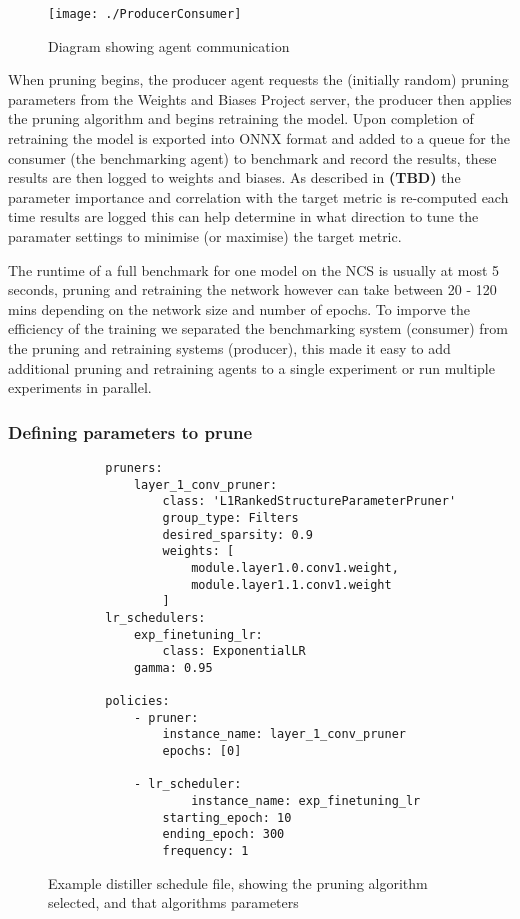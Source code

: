 \documentclass[../Dissertation.tex]{subfiles}
\begin{document}
\begin{figure}[H]
    \centering
    \texttt{[image: ./ProducerConsumer]}
    \caption{Diagram showing agent communication}
    \label{fig:agentCommunication}
\end{figure}

When pruning begins, the producer agent requests the (initially random) pruning parameters from the Weights and Biases Project server, the producer then applies the pruning algorithm and begins retraining the model.
Upon completion of retraining the model is exported into ONNX format and added to a queue for the consumer (the benchmarking agent) to benchmark and record the results, these results are then logged to weights and biases.
As described in \textbf{(TBD)} the parameter importance and correlation with the target metric is re-computed each time results are logged this can help determine in what direction to tune the paramater settings to minimise (or maximise) the target metric.

The runtime of a full benchmark for one model on the NCS is usually at most 5 seconds, pruning and retraining the network however can take between 20 - 120 mins depending on the network size and number of epochs. 
To imporve the efficiency of the training we separated the benchmarking system (consumer) from the pruning and retraining systems (producer), this made it easy to add additional pruning and retraining agents to a single experiment or run multiple experiments in parallel.

\subsubsection{Defining parameters to prune}

\singlespacing
\begin{figure}[H]
    \begin{verbatim}
        pruners: 
            layer_1_conv_pruner:
                class: 'L1RankedStructureParameterPruner'
                group_type: Filters
                desired_sparsity: 0.9
                weights: [
                    module.layer1.0.conv1.weight,
                    module.layer1.1.conv1.weight
                ]
        lr_schedulers:
            exp_finetuning_lr:
                class: ExponentialLR
            gamma: 0.95

        policies:
            - pruner:
                instance_name: layer_1_conv_pruner
                epochs: [0]
            
            - lr_scheduler:
                    instance_name: exp_finetuning_lr
                starting_epoch: 10
                ending_epoch: 300
                frequency: 1
    \end{verbatim}
    \caption{Example distiller schedule file, showing the pruning algorithm selected, and that algorithms parameters}
    \label{fig:CompressionSchedule}
\end{figure}
\doublespacing
\end{document}
